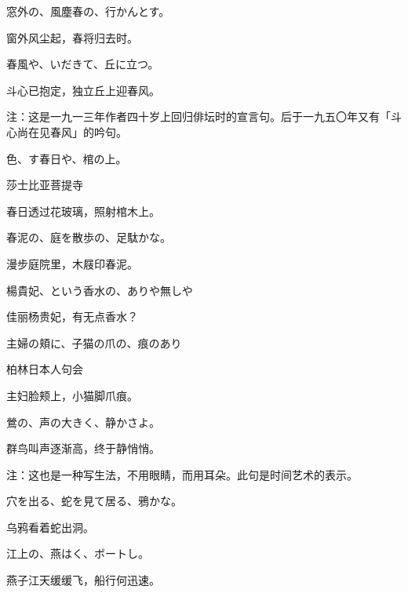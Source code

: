 \begin{haiku}
    {\FH 窓外の、風塵春の、行かんとす。}

    {\FK 窗外风尘起，春将归去时。}
\end{haiku}

\begin{haiku}
    {\FH 春風や、いだきて、丘に立つ。}

    {\FK 斗心已抱定，独立丘上迎春风。}

    {\FT 注：这是一九一三年作者四十岁上回归俳坛时的宣言句。后于一九五〇年又有「斗心尚在见春风」的吟句。}
\end{haiku}

\begin{haiku}
    {\FH 色、す春日や、棺の上。}

    {\FK 莎士比亚菩提寺}

    {\FK 春日透过花玻璃，照射棺木上。}
\end{haiku}

\begin{haiku}
    {\FH 春泥の、庭を散歩の、足駄かな。}

    {\FK 漫步庭院里，木屐印春泥。}
\end{haiku}

\begin{haiku}
    {\FH 楊貴妃、という香水の、ありや無しや}

    {\FK 佳丽杨贵妃，有无点香水？}
\end{haiku}

\begin{haiku}
    {\FH 主婦の頬に、子猫の爪の、痕のあり}

    {\FK 柏林日本人句会}

    {\FK 主妇脸颊上，小猫脚爪痕。}
\end{haiku}

\begin{haiku}
    {\FH 鶯の、声の大きく、静かさよ。}

    {\FK 群鸟叫声逐渐高，终于静悄悄。}

    {\FT 注：这也是一种写生法，不用眼睛，而用耳朵。此句是时间艺术的表示。}
\end{haiku}

\begin{haiku}
    {\FH 穴を出る、蛇を見て居る、鴉かな。}

    {\FK 乌鸦看着蛇出洞。}
\end{haiku}

\begin{haiku}
    {\FH 江上の、燕はく、ボートし。}

    {\FK 燕子江天缓缓飞，船行何迅速。}
\end{haiku}

